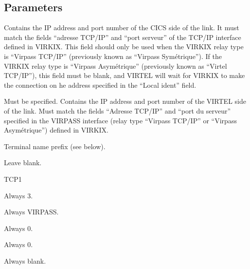 \documentclass[letterpaper,10pt,english]{sphinxmanual}
\begin{document}
\ignorespaces 

\subsection{Parameters}
\label{\detokenize{connectivity_guide:index-43}}\label{\detokenize{connectivity_guide:id16}}\begin{description}
\sphinxAtStartPar
Contains the IP address and port number of the CICS side of the link. It must match the fields “adresse TCP/IP” and “port serveur” of the TCP/IP interface defined in VIRKIX. This field should only be used when the VIRKIX relay type is “Virpass TCP/IP” (previously known as “Virpass Symétrique”). If the VIRKIX relay type is “Virpass Asymétrique” (previously known as “Virtel TCP/IP”), this field must be blank, and VIRTEL will wait for VIRKIX to make the connection on he address specified in the “Local ident” field.

\sphinxAtStartPar
Must be specified. Contains the IP address and port number of the VIRTEL side of the link. Must match the fields “Adresse TCP/IP” and “port du serveur” specified in the VIRPASS interface (relay type “Virpass TCP/IP” or “Virpass Asymétrique”) defined in VIRKIX.

\sphinxAtStartPar
Terminal name prefix (see below).

\sphinxAtStartPar
Leave blank.

\sphinxAtStartPar
TCP1

\sphinxAtStartPar
Always 3.

\sphinxAtStartPar
Always VIRPASS.

\sphinxAtStartPar
Always 0.

\sphinxAtStartPar
Always 0.

\sphinxAtStartPar
Always blank.

\end{description}

\ignorespaces 
\end{document}
